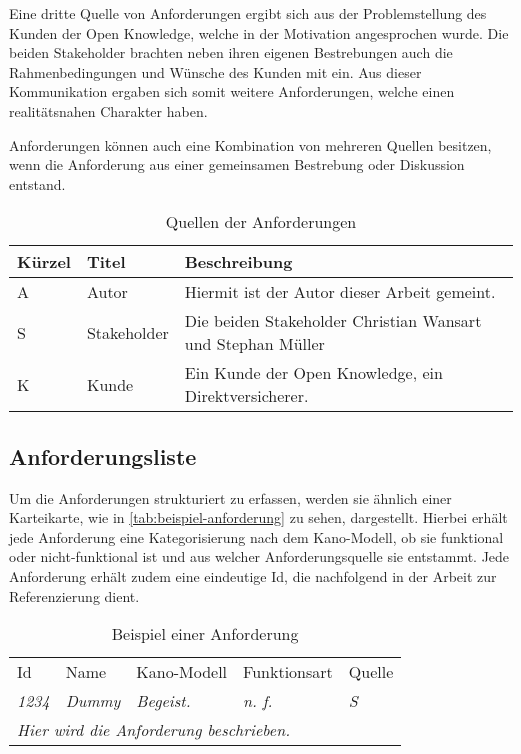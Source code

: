 Eine dritte Quelle von Anforderungen ergibt sich aus der Problemstellung des Kunden der Open Knowledge, welche in der Motivation angesprochen wurde. Die beiden Stakeholder brachten neben ihren eigenen Bestrebungen auch die Rahmenbedingungen und Wünsche des Kunden mit ein. Aus dieser Kommunikation ergaben sich somit weitere Anforderungen, welche einen realitätsnahen Charakter haben.

Anforderungen können auch eine Kombination von mehreren Quellen besitzen, wenn die Anforderung aus einer gemeinsamen Bestrebung oder Diskussion entstand.

\begin{table}[H]
\begin{tabular}{ |p{1.15cm}|p{1.9cm}|p{10.45cm}| }
	\hline
	Kürzel & Titel & Beschreibung \\
	\hline
	A & Autor & Hiermit ist der Autor dieser Arbeit gemeint. \\
	\hline
	S & Stakeholder & Die beiden Stakeholder Christian Wansart und Stephan Müller \\
	\hline
	K & Kunde & Ein Kunde der Open Knowledge, ein Direktversicherer. \\
	\hline
\end{tabular}
 \captionsetup{justification=centering}
  \caption{Quellen der Anforderungen}
   \label{tab:quellen-der-anforderungen}
\end{table}
	
\subsection{Anforderungsliste}

Um die Anforderungen strukturiert zu erfassen, werden sie ähnlich einer Karteikarte, wie in \autoref{tab:beispiel-anforderung} zu sehen, dargestellt. Hierbei erhält jede Anforderung eine Kategorisierung nach dem Kano-Modell, ob sie funktional oder nicht-funktional ist und aus welcher Anforderungsquelle sie entstammt. Jede Anforderung erhält zudem eine eindeutige Id, die nachfolgend in der Arbeit zur Referenzierung dient.

\begin{table}[H]
\begin{tabular}{ |p{1.25cm}|p{5.5cm}|p{2.25cm}|p{2.1cm}|p{1.25cm}| }
\hline
Id            & Name          & Kano-Modell   & Funktionsart  & Quelle        \\
\textit{1234} & \textit{Dummy} & \textit{Begeist.} & \textit{n. f.} & \textit{S} \\
\hline
\multicolumn{5}{|l|}{\textit{Hier wird die Anforderung beschrieben.}} \\
\hline
\end{tabular}
 \captionsetup{justification=centering}
  \caption{Beispiel einer Anforderung}
   \label{tab:beispiel-anforderung}
\end{table}



